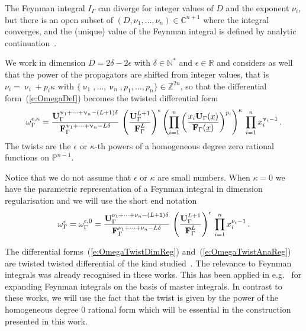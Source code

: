\documentclass[a4paper,12pt]{article}
\numberwithin{equation}{section}
\numberwithin{figure}{section}
\begin{document}
The Feynman integral $I_\Gamma$ can diverge  for integer values of $D$ and 
the exponent $\nu_i$, but there is an open subset of
$(D,\nu_1,\dots,\nu_n)\in\mathbb C^{n+1}$ where  the integral
converges,  and the (unique) value of the Feynman integral is  defined by analytic continuation~\cite{Speer}.


We work in dimension $D=2\delta-2\epsilon$ with $\delta\in\mathbb N^*$ and
$\epsilon\in\mathbb R$ and  considers as well that the power of the propagators are shifted from integer values, that is  $\nu_i=\upnu_i
+ p_i \kappa$ with $\{\upnu_1,\dots,\upnu_n,p_1,\dots,p_n\}\in\mathbb Z^{2n}$, so that the 
differential form~(\ref{e:OmegaDef}) becomes the twisted
differential form
\begin{equation}\label{e:OmegaTwistAnaReg}
	\omega^{\epsilon,\kappa}_\Gamma = { \textbf{U}_\Gamma
		^{\upnu_1+\cdots+\upnu_n-(L+1)\delta}  \over \textbf{F}_\Gamma
		^{\upnu_1+\cdots+\upnu_n-L\delta}
	}\,\left(\textbf{U}_\Gamma^{L+1}\over \textbf{F}_\Gamma^L\right)^\epsilon
	\left(\prod_{i=1}^n \left(x_i \textbf{U}_\Gamma(\underline x)\over
	\textbf{F}_\Gamma(\underline x)\right)^{p_i}\right)^{\kappa} \, \prod_{i=1}^n x_i^{\upnu_i-1} \,.
\end{equation}
%
The twists are the $\epsilon$ or $\kappa$-th powers of a homogeneous
degree zero rational functions on $\mathbb
P^{n-1}$.


Notice that we do not assume that $\epsilon$ or $\kappa$ are small numbers.
When $\kappa=0$ we have the parametric representation of a Feynman
integral in dimension regularisation and we will use the short end
notation 
\begin{equation}\label{e:OmegaTwistDimReg}
\omega^\epsilon_\Gamma=\omega^{\epsilon,0}_\Gamma = { \textbf{U}_\Gamma ^{\nu_1+\cdots+\nu_n-(L+1)\delta}  \over \textbf{F}_\Gamma ^{\nu_1+\cdots+\nu_n-L\delta} }\,
	\left(\textbf{U}_\Gamma^{L+1}\over \textbf{F}_\Gamma^{L}\right)^{\epsilon} \, \prod_{i=1}^n x_i^{\nu_i-1} \, .
\end{equation}
%

\medskip

The differential forms~(\ref{e:OmegaTwistDimReg})
and~(\ref{e:OmegaTwistAnaReg}) are twisted
twisted differential of the kind
studied~\cite{Aomoto1,Aomoto,Aomoto_1982,AomotoBook}.
The
relevance to Feynman integrals was already recognised in these works. 
This has been applied in
e.g.~\cite{Mizera:2017rqa,Frellesvig:2019uqt,Cacciatori:2021nli,Munch:2023ifm,Brunello:2023rpq,Teschke:2024bct}  for
expanding Feynman integrals on the basis of master integrals. In contrast to these works, 
%
we will use
the fact that the twist is given by
the power of the homogeneous degree 0 rational form
which will be essential
in the construction presented in this work.
\end{document}
